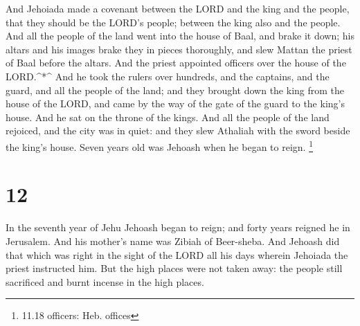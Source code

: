  And Jehoiada made a covenant between the LORD and the king
and the people, that they should be the LORD's people; between the king
also and the people.  And all the people of the land went
into the house of Baal, and brake it down; his altars and his images
brake they in pieces thoroughly, and slew Mattan the priest of Baal
before the altars. And the priest appointed officers over the house of
the LORD.\^{}*\^{}  And he took the rulers over hundreds,
and the captains, and the guard, and all the people of the land; and
they brought down the king from the house of the LORD, and came by the
way of the gate of the guard to the king's house. And he sat on the
throne of the kings.  And all the people of the land
rejoiced, and the city was in quiet: and they slew Athaliah with the
sword beside the king's house.  Seven years old was Jehoash
when he began to reign. \footnote{11.18 officers: Heb. offices}

\hypertarget{section-11}{%
\section{12}\label{section-11}}

 In the seventh year of Jehu Jehoash began to reign; and
forty years reigned he in Jerusalem. And his mother's name was Zibiah of
Beer-sheba.  And Jehoash did that which was right in the
sight of the LORD all his days wherein Jehoiada the priest instructed
him.  But the high places were not taken away: the people
still sacrificed and burnt incense in the high places.

